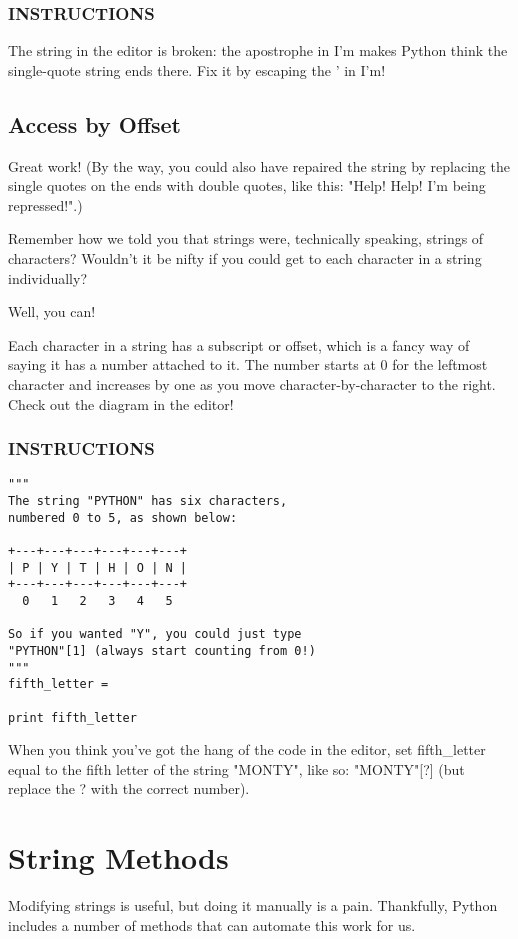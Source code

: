 \documentclass[12pt,a4paper,final,twoside,onecolumn,titlepage]{book}
\begin{document}
\subsubsection{INSTRUCTIONS}
The string in the editor is broken: the apostrophe in I'm makes Python think the single-quote string ends there. Fix it by escaping the ' in I'm!


\subsection{Access by Offset}
Great work! (By the way, you could also have repaired the string by replacing the single quotes on the ends with double quotes, like this: "Help! Help! I'm being repressed!".)

Remember how we told you that strings were, technically speaking, strings of characters? Wouldn't it be nifty if you could get to each character in a string individually?

Well, you can!

Each character in a string has a subscript or offset, which is a fancy way of saying it has a number attached to it. The number starts at 0 for the leftmost character and increases by one as you move character-by-character to the right. Check out the diagram in the editor!

\subsubsection{INSTRUCTIONS}
\begin{lstlisting}
"""
The string "PYTHON" has six characters,
numbered 0 to 5, as shown below:

+---+---+---+---+---+---+
| P | Y | T | H | O | N |
+---+---+---+---+---+---+
  0   1   2   3   4   5

So if you wanted "Y", you could just type
"PYTHON"[1] (always start counting from 0!)
"""
fifth_letter = 

print fifth_letter
\end{lstlisting}

When you think you've got the hang of the code in the editor, set fifth\_letter equal to the fifth letter of the string "MONTY", like so: "MONTY"[?] (but replace the ? with the correct number).

\section{String Methods}
Modifying strings is useful, but doing it manually is a pain. Thankfully, Python includes a number of methods that can automate this work for us.
\end{document}
